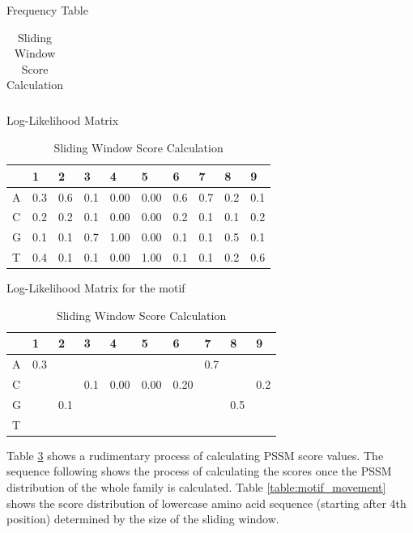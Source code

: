 \begin{table}
\begin{subtable}[]{Frequency Table}
\begin{tabular}{|l|l|l|l|l|l|l|l|l|l|}
    \end{tabular}
  \end{subtable}

  \begin{subtable}[]
    {Log-Likelihood Matrix}
    \begin{tabular}{|l|l|l|l|l|l|l|l|l|l|}
    \hline 

        & 1 & 2 & 3 & 4 & 5 & 6 & 7 & 8 & 9 \\ \hline
    A & 0.3 & 0.6 & 0.1 & 0.00 & 0.00 & 0.6 & 0.7 & 0.2 & 0.1 \\ \hline
    C & 0.2 & 0.2 & 0.1 & 0.00 & 0.00 & 0.2 & 0.1 & 0.1 & 0.2 \\ \hline
    G & 0.1 & 0.1 & 0.7 & 1.00 & 0.00 & 0.1 & 0.1 & 0.5 & 0.1 \\ \hline
    T & 0.4 & 0.1 & 0.1 & 0.00 & 1.00 & 0.1 & 0.1 & 0.2 & 0.6 \\ \hline
    
    \end{tabular}
  \end{subtable}

  \begin{subtable}[]
    {Log-Likelihood Matrix for the motif}
    \begin{tabular}{|l|l|l|l|l|l|l|l|l|l|}
    \hline 
    
        & 1 & 2 & 3 & 4 & 5 & 6 & 7 & 8 & 9 \\ \hline
    A & 0.3 &  &  &  &  &  & 0.7 &  &  \\ \hline
    C &  &  & 0.1 & 0.00 & 0.00 & 0.20 &  &  & 0.2 \\ \hline
    G &  & 0.1 &  &  &  &  &  & 0.5 &  \\ \hline
    T &  &  &  &  &  &  &  &  &  \\ \hline
    
    \end{tabular}
    \caption{Sliding Window Score Calculation}
    \label{table:motif_movement}
  \end{subtable}
  
  \label{table:PSSM_Analysis} 
\end{table}

Table \ref{table:PSSM_Analysis} shows a rudimentary process of calculating PSSM score values. The sequence following shows the process of calculating the scores once the PSSM distribution of the whole family is calculated. Table \ref{table:motif_movement} shows the score distribution of lowercase amino acid sequence (starting after 4th position) determined by the size of the sliding window.

